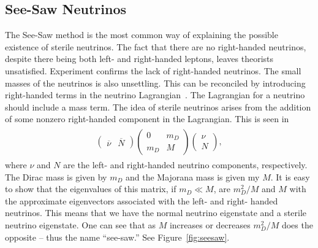 \documentclass[aps,prd,twocolumn,nofootinbib]{revtex4-1}
\begin{document}
\subsection{See-Saw Neutrinos}
The See-Saw method is the most common way of explaining the possible existence of sterile neutrinos.  The fact that there are no right-handed neutrinos, despite there being both left- and right-handed leptons, leaves theorists unsatisfied. Experiment confirms the lack of right-handed neutrinos.  The small masses of the neutrinos is also unsettling. This can be reconciled by introducing right-handed terms in the neutrino Lagrangian~\cite{justin1}. The Lagrangian for a neutrino should include a mass term.  The idea of sterile neutrinos arises from the addition of some nonzero right-handed component in the Lagrangian. This is seen in
\begin{align}
  \begin{split}
  \begin{pmatrix}
    \overline{\nu} & \overline{N}
  \end{pmatrix}
  \begin{pmatrix}
    0 & m_D \\ m_D & M
  \end{pmatrix}
  \begin{pmatrix}
    \nu \\ N
  \end{pmatrix},
  \end{split}
\end{align}
where $\nu$ and $N$ are the left- and right-handed neutrino components, respectively. The Dirac mass is given by $m_D$ and the Majorana mass is given my $M$. It is easy to show that the eigenvalues of this matrix, if $m_D \ll M$, are $m_D^2/M$ and $M$ with the approximate eigenvectors associated with the left- and right- handed neutrinos. This means that we have the normal neutrino eigenstate and a sterile neutrino eigenstate. One can see that as $M$ increases or decreases $m_D^2/M$ does the opposite -- thus the name ``see-saw.'' See Figure~\ref{fig:seesaw}.
\end{document}
